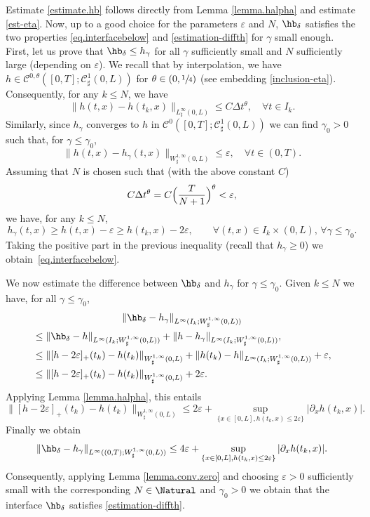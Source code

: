 Estimate \eqref{estimate.hb} follows directly from Lemma \ref{lemma.halpha} and estimate \eqref{est-eta}.
Now, up to a good choice for the parameters $\varepsilon$ and $N$, $\hb_{\delta}$ satisfies the two
properties \eqref{eq.interfacebelow} and \eqref{estimation-diffth} for $\gamma$ small enough. First, let us prove that $\hb_{\delta}\leq h_{\gamma}$ for all $\gamma$ sufficiently small and $N$ sufficiently large (depending on $\varepsilon$). We recall that by interpolation, we have $h \in \mathcal{C}^{0,\theta}([0,T];\mathcal{C}^{1}_{\sharp}(0,L))$ for $\theta\in(0,\sfrac{1}{4})$ (see embedding \eqref{inclusion-eta}). Consequently, for any $k \leq N$, we have
\[
\|h(t,x) - h(t_{k},x)\|_{L^{\infty}_{\sharp}(0,L)} \leq C \Delta t^{\theta}, \quad \forall t \in I_k.
\]
Similarly, since $h_{\gamma}$ converges to $h$ in $\mathcal{C}^{0}([0,T];\mathcal{C}_\sharp^{1}(0,L))$ we can find $\gamma_0 >0$ such that, for $\gamma \leq \gamma_0$,
\[
\|h(t,x) - h_{\gamma}(t,x)\|_{W^{1,\infty}_{\sharp}(0,L)} \leq \varepsilon, \quad \forall t \in (0,T).
\]
Assuming that $N$ is chosen such that (with the above constant $C$)
\[
C \Delta t^{\theta}=C \Bigl(\dfrac T{N+1} \Bigr)^{\theta} < \varepsilon,
\]
we have, for any $k \leq N$,
\[
h_{\gamma}(t,x)\geq h(t,x)-\varepsilon\geq h(t_{k},x)-2\varepsilon, \qquad \forall(t,x)\in I_{k}\times(0,L),\,\forall \gamma\leq \gamma_{0}.
\]
Taking the positive part in the previous inequality (recall that $h_{\gamma}\!\geq\!0$) we obtain~\eqref{eq.interfacebelow}.

We now estimate the difference between $\hb_{\delta}$ and $h_{\gamma}$ for $\gamma \leq \gamma_0$.
Given $k \leq N$ we have, for all $\gamma \leq \gamma_0$,\vspace*{-3pt}
\begin{multline*}
\| \hb_{\delta}- h_\gamma\|_{L^\infty(I_k; W_\sharp^{1, \infty}(0, L))}\\
\begin{aligned}
&\leq \| \hb_{\delta}- h\|_{L^\infty(I_k; W_\sharp^{1, \infty}(0, L))}
+ \| h- h_\gamma\|_{L^\infty(I_k; W_\sharp^{1, \infty}(0, L))},\\
&\leq \| [h-2\varepsilon]_+(t_k)- h(t_k)\|_{W_\sharp^{1, \infty}(0, L)}
+\| h({t_k})- h\|_{L^\infty(I_k; W_\sharp^{1, \infty}(0, L))}
+ \varepsilon,\\
&\leq \| [h-2\varepsilon]_+(t_k)- h(t_k)\|_{W_\sharp^{1, \infty}(0, L)}
+2\varepsilon.
\end{aligned}
\end{multline*}
Applying Lemma \ref{lemma.halpha}, this entails
\[
\| [h-2\varepsilon]_+(t_k)- h(t_k)\|_{W_\sharp^{1, \infty}(0, L)}\leq 2\varepsilon +\sup_{\{x\in [0, L], h(t_k,x)\leq 2\varepsilon\}}\vert\partial_x h(t_k,x)\vert.
\]
Finally we obtain
\[
\| \hb_{\delta}- h_\gamma\|_{L^\infty((0,T); W_\sharp^{1, \infty}(0, L))}\leq 4 \varepsilon + \sup_{\{x\in [0, L], h(t_k, x)\leq 2\varepsilon\}}\vert\partial_x h(t_k,x )\vert. 
\]
Consequently, applying Lemma \ref{lemma.conv.zero} and choosing $\varepsilon>0$ sufficiently small with the corresponding $N \in\Natural$ and $\gamma_{0}>0$ we obtain that the interface $\hb_{\delta}$ satisfies \eqref{estimation-diffth}.

